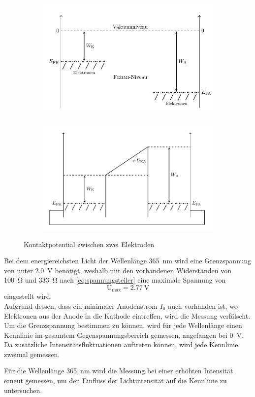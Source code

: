 \begin{figure}[htb]
	\centering
	\begin{subfigure}[c]{0.46\linewidth}
		\includegraphics[width=\linewidth]{../figs/fermi1.png}
	\end{subfigure}
	\begin{subfigure}[c]{0.46\linewidth}
		\includegraphics[width=\linewidth]{../figs/fermi2.png}
	\end{subfigure}
	\caption{Kontaktpotential zwischen zwei Elektroden}
\end{figure}

Bei dem energiereichsten Licht der Wellenlänge \SI{365}{\nano\meter} wird eine Grenzspannung von unter
\SI{2.0}{\volt} benötigt, weshalb mit den vorhandenen Widerständen von \SI{100}{\ohm} und \SI{333}{\ohm}
nach \cref{eq:spannungsteiler} eine maximale Spannung von
\[\mathrm U_\mathrm{max} = \SI{2.77}{\volt}\]
eingestellt wird.\\
Aufgrund dessen, dass ein minimaler Anodenstrom $I_0$ auch vorhanden ist, wo Elektronen aus der
Anode in die Kathode eintreffen, wird die Messung verfälscht. Um die Grenzspannung bestimmen zu können,
wird für jede Wellenlänge einen Kennlinie im gesamtem Gegenspannungsbereich gemessen, angefangen
bei \SI{0}{\volt}. Da zusätzliche Intensitätsfluktuationen auftreten können, wird jede Kennlinie
zweimal gemessen.\\\par
Für die Wellenlänge \SI{365}{\nano\meter} wird die Messung bei einer erhöhten Intensität
erneut gemessen, um den Einfluss der Lichtintensität auf die Kennlinie zu untersuchen.

